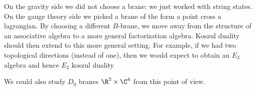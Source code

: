 \documentclass[12pt]{amsart}
\begin{document}
\begin{rmk}
  On the gravity side we did not choose a brane: we just worked with string
  states. On the gauge theory side we picked a brane of the form a point cross
  a lagrangian. By choosing a different $B$-brane, we move away from the
  structure of an associative algebra to a more general factorization algebra.
  Koszul duality should then extend to this more general setting. For example,
  if we had two topological directions (instead of one), then we would expect
  to obtain an $E_2$ algebra and hence $E_2$ koszul duality
\end{rmk}

\begin{rmk}
  We could also study $D_0$ branes $\R^2\times \C^4$ from this point of view.
\end{rmk}
\end{document}
